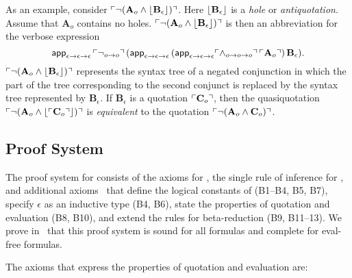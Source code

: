 \documentclass[fleqn]{llncs}
\begin{document}
As an example, consider $\ulcorner\neg(\textbf{A}_o \wedge
  \lfloor\textbf{B}_\epsilon\rfloor)\urcorner$. Here $\lfloor\textbf{B}_\epsilon\rfloor$
is a \emph{hole} or \emph{antiquotation}. Assume that
$\textbf{A}_o$ contains no holes.  $\ulcorner\neg(\textbf{A}_o \wedge
  \lfloor\textbf{B}_\epsilon\rfloor)\urcorner$ is then an abbreviation for the
verbose expression
\[\mbox{\sf app}_{\epsilon \rightarrow
  \epsilon \rightarrow \epsilon} \, \ulcorner\neg_{o \rightarrow o}\urcorner \,
(\mbox{\sf app}_{\epsilon \rightarrow \epsilon \rightarrow \epsilon} \,
(\mbox{\sf app}_{\epsilon \rightarrow \epsilon \rightarrow \epsilon}
\ulcorner\wedge_{o \rightarrow o \rightarrow o}\urcorner \, \ulcorner\textbf{A}_o\urcorner)
\, \textbf{B}_\epsilon).\] $\ulcorner\neg(\textbf{A}_o \wedge
  \lfloor\textbf{B}_\epsilon\rfloor)\urcorner$ represents the syntax tree
of a negated conjunction in which the part of the tree corresponding
to the second conjunct is replaced by the syntax tree represented by
$\textbf{B}_\epsilon$.  If $\textbf{B}_\epsilon$ is a quotation
$\ulcorner\textbf{C}_o\urcorner$, then the quasiquotation
$\ulcorner\neg(\textbf{A}_o \wedge
  \lfloor\ulcorner\textbf{C}_o\urcorner\rfloor)\urcorner$ is \emph{equivalent} to the
quotation $\ulcorner\neg(\textbf{A}_o \wedge \textbf{C}_o)\urcorner$.

\subsection{Proof System}\label{subsec:cttqe-proof-system}

The proof system for {\churchqe} consists of the axioms for {\qzero},
the single rule of inference for {\qzero}, and additional
axioms~\cite[B1--B13]{Farmer18} that define the logical constants
of {\churchqe} (B1--B4, B5, B7), specify $\epsilon$ as an inductive type
(B4, B6), state the properties of quotation and evaluation (B8, B10),
and extend the rules for beta-reduction (B9, B11--13).  We prove
in~\cite{Farmer18} that this proof system is sound for all
formulas and complete for eval-free formulas.

The axioms that express the properties of quotation and evaluation are:

\medskip
\end{document}
